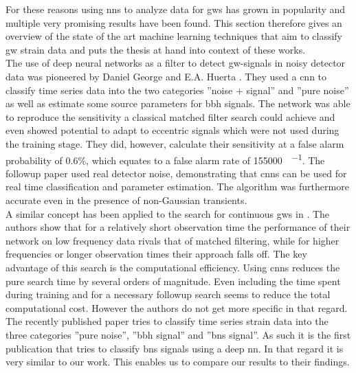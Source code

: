 For these reasons using \gls{nn}s to analyze data for \gls{gw}s has grown in popularity and multiple very promising results have been found. This section therefore gives an overview of the state of the art machine learning techniques that aim to classify \gls{gw} strain data and puts the thesis at hand into context of these works.\\
The use of deep neural networks as a filter to detect \gls{gw}-signals in noisy detector data was pioneered by Daniel George and E.A. Huerta \cite{original_deep_filtering}. They used a \gls{cnn} to classify time series data into the two categories ''noise + signal'' and ''pure noise'' as well as estimate some source parameters for \gls{bbh} signals. The network was able to reproduce the sensitivity a classical matched filter search could achieve and even showed potential to adapt to eccentric signals which were not used during the training stage. They did, however, calculate their sensitivity at a false alarm probability of 0.6\%, which equates to a false alarm rate of \SI[per-mode=fraction]{155000}{\samples\per\month}. The followup paper \cite{huerta_parameter_estimation} used real detector noise, demonstrating that \gls{cnn}s can be used for real time classification and parameter estimation. The algorithm was furthermore accurate even in the presence of non-Gaussian transients.\\
A similar concept has been applied to the search for continuous \gls{gw}s in \cite{paper_christoph}. The authors show that for a relatively short observation time the performance of their network on low frequency data rivals that of matched filtering, while for higher frequencies or longer observation times their approach falls off. The key advantage of this search is the computational efficiency. Using \gls{cnn}s reduces the pure search time by several orders of magnitude. Even including the time spent during training and for a necessary followup search seems to reduce the total computational cost. However the authors do not get more specific in that regard.\\
The recently published paper \cite{bns_network} tries to classify time series strain data into the three categories ''pure noise'', ''\gls{bbh} signal'' and ''\gls{bns} signal''. As such it is the first publication that tries to classify \gls{bns} signals using a deep \gls{nn}. In that regard it is very similar to our work. This enables us to compare our results to their findings.\\
